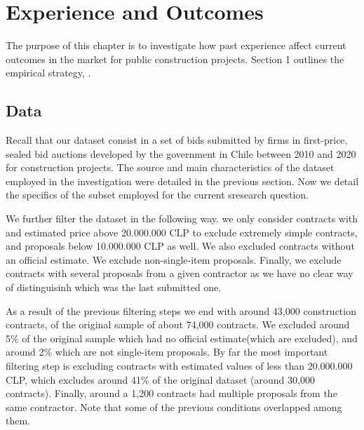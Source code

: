 \chapter{Experience and Outcomes
}
The purpose of this chapter is to investigate how past experience affect current outcomes in the market for public construction projects. Section 1 outlines the empirical strategy, .

\section{Data}
Recall that our dataset consist in a set of bids submitted by firms in first-price, sealed bid auctions developed by the government in Chile between 2010 and 2020 for construction projects. The source and main characteristics of the dataset employed in the investigation were detailed in the previous section. Now we detail the specifics of the subset employed for the current sresearch question.

 We further filter the dataset in the following way. we only consider contracts with and estimated price above 20.000.000 CLP to exclude extremely simple contracts, and proposals below 10.000.000 CLP as well. We also excluded contracts without an official estimate. We exclude non-single-item proposals. Finally, we exclude contracts with several proposals from a given contractor as we have no clear way of distinguisinh which was the last submitted one.

As a result of the previous filtering steps we end with around 43,000 construction contracts, of the original sample of about 74,000 contracts. We excluded around 5\% of the original sample which had no  official estimate(which are excluded), and around 2\% which are not single-item proposals. By far the most important filtering step is excluding contracts with estimated values of less than 20.000.000 CLP, which excludes around 41\% of the original dataset (around 30,000 contracts). Finally, around a 1,200 contracts had multiple proposals from the same contractor. Note that some of the previous conditions overlapped among them.

